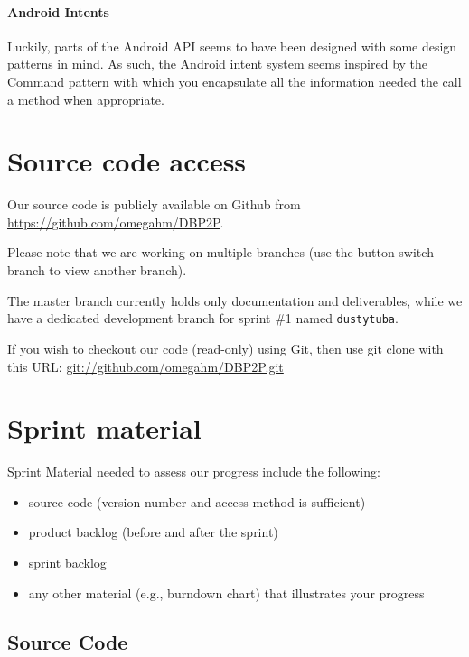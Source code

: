 \documentclass[a4paper,11pt]{article}
\begin{document}
\paragraph{Android Intents}
Luckily, parts of the Android API seems to have been designed with some design patterns in mind. As such, the Android intent system seems inspired by the Command\cite{GangOfFour} pattern with which you encapsulate all the information needed the call a method when appropriate.

\section{Source code access}
Our source code is publicly available on Github from \url{https://github.com/omegahm/DBP2P}.

Please note that we are working on multiple branches (use the button switch branch to view another branch).

The master branch currently holds only documentation and deliverables, while we have a dedicated development branch for sprint \#1 named \texttt{dustytuba}.

If you wish to checkout our code (read-only) using Git, then use git clone with this URL:
\url{git://github.com/omegahm/DBP2P.git}


\section{Sprint material}
Sprint Material needed to assess our progress include the following:
\begin{itemize}
\item source code (version number and access method is sufficient)
\item product backlog (before and after the sprint)
\item sprint backlog
\item any other material (e.g., burndown chart) that illustrates your progress
\end{itemize}


\subsection{Source Code}

\end{document}
